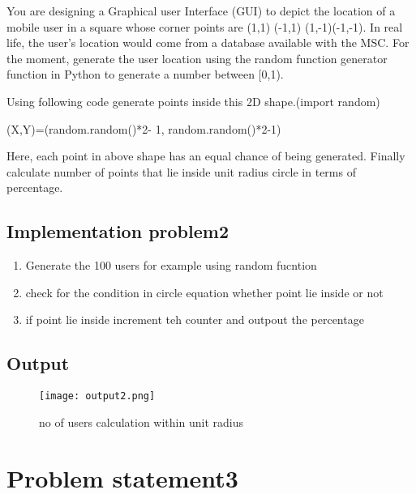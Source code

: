 \documentclass[12pt]{article}
\begin{document}
{{You are designing a Graphical user Interface (GUI) to depict the location of a mobile user in a square whose corner points are (1,1) (-1,1) (1,-1)(-1,-1). In real life, the user’s location would come from a database available with the MSC. For the moment, generate the user location using the random function generator function in Python to generate a number between [0,1). 

Using following code generate points inside this 2D shape.(import random)

 (X,Y)=(random.random()*2- 1, random.random()*2-1)

 Here, each point in above shape has an equal chance of being generated.
Finally calculate number of points that lie inside unit radius circle in terms of percentage.

\subsection{Implementation problem2}
\begin{enumerate}
\item{Generate the 100 users for example using random fucntion}
\item{check for the condition in circle equation whether point lie inside or not}
\item{if point lie inside increment teh counter and outpout the percentage}
\end{enumerate}
{



\subsection{Output}
\begin{figure}[H]
{
 \centering
\texttt{[image: output2.png]}
\caption{no of users calculation within unit radius}
\vspace{2cm}

}
\end{figure}



\newpage
\section{Problem statement3} %

}}}
\end{document}
